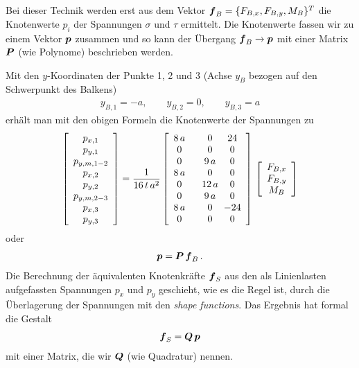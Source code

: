 Bei dieser Technik werden erst aus dem Vektor $\mbox{\boldmath $f$}_B = \{F_{B,x}, F_{B,y}, M_B\}^T$ die Knotenwerte $p_i$ der Spannungen $\sigma$ und $\tau$ ermittelt. Die Knotenwerte fassen wir zu einem  Vektor $\mbox{\boldmath $p$} $ zusammen und so kann der \"{U}bergang $\mbox{\boldmath $f$}_B \to \mbox{\boldmath $p$}$ mit einer Matrix $\mbox{\boldmath $P$}$ (wie Polynome) beschrieben werden.

Mit den $y$-Koordinaten der Punkte 1, 2 und 3 (Achse $y_B$ bezogen auf den Schwerpunkt des Balkens)
\begin{align}
y_{B,1} = - a, \qquad y_{B,2} = 0, \qquad y_{B,3} = a
\end{align}
erh\"{a}lt man mit den obigen Formeln die Knotenwerte der Spannungen zu
\begin{align}
\left[\barr{c} p_{x,1} \\ p_{y,1}  \\p_{y,m,1-2} \\ p_{x,2} \\ p_{y,2} \\ p_{y,m,2-3} \\  p_{x,3} \\  p_{y,3}\earr \right] = \frac{ 1}{16\,t\,a^2}\left[\barr{c @{\hspace{6mm}} c @{\hspace{2mm}} c} 8\,a &0 & 24 \\ 0 & 0 & 0 \\ 0 & 9\,a & 0 \\ 8\,a &0 & 0 \\ 0 &12\,a &0 \\ 0 & 9\,a & 0 \\ 8\,a &0 & -24 \\ 0 & 0 &0  \earr \right]\,\left[\barr{c} F_{B,x} \\ F_{B,y} \\ M_B \earr \right]
\end{align}
oder
\begin{align}\label{Eq26}
\mbox{\boldmath $p$} = \mbox{\boldmath $P$}\,\mbox{\boldmath $f$}_B\,.
\end{align}
Die Berechnung der \"{a}quivalenten Knotenkr\"{a}fte $\mbox{\boldmath $f$}_S$ aus den als Linienlasten aufgefassten Spannungen $p_x$ und $p_y$ geschieht, wie es die Regel ist, durch die \"{U}berlagerung der Spannungen mit den {\em shape functions\/}. Das Ergebnis hat formal die Gestalt
\begin{align}
\mbox{\boldmath $f$}_S = \mbox{\boldmath $Q$}\,\mbox{\boldmath $p$}
\end{align}
mit einer Matrix, die wir $\mbox{\boldmath $Q$}$ (wie Quadratur) nennen.

